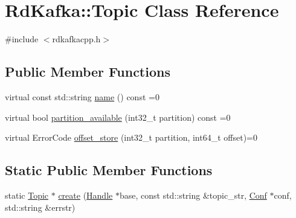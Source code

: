 \hypertarget{classRdKafka_1_1Topic}{\section{Rd\-Kafka\-:\-:Topic Class Reference}
\label{classRdKafka_1_1Topic}
}


{\ttfamily \#include $<$rdkafkacpp.\-h$>$}

\subsection*{Public Member Functions}
\begin{DoxyCompactItemize}
\item 
virtual const std\-::string \hyperlink{classRdKafka_1_1Topic_af61ec8b3c384a8de5a12f804e771c63d}{name} () const =0
\item 
virtual bool \hyperlink{classRdKafka_1_1Topic_a8e2f4ce86845398312d319001462577c}{partition\-\_\-available} (int32\-\_\-t partition) const =0
\item 
virtual Error\-Code \hyperlink{classRdKafka_1_1Topic_a218a291c89f5d4c311bec3c2b2bd8056}{offset\-\_\-store} (int32\-\_\-t partition, int64\-\_\-t offset)=0
\end{DoxyCompactItemize}
\subsection*{Static Public Member Functions}
\begin{DoxyCompactItemize}
\item 
static \hyperlink{classRdKafka_1_1Topic}{Topic} $\ast$ \hyperlink{classRdKafka_1_1Topic_a01b26449715177b98a3f7edaf42d75a7}{create} (\hyperlink{classRdKafka_1_1Handle}{Handle} $\ast$base, const std\-::string \&topic\-\_\-str, \hyperlink{classRdKafka_1_1Conf}{Conf} $\ast$conf, std\-::string \&errstr)
\end{DoxyCompactItemize}

